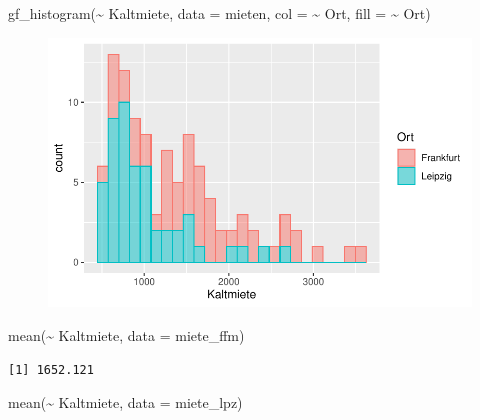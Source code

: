 \documentclass[
  a4paper,
  DIV=11]{scrartcl}
\newenvironment{Shaded}{\begin{snugshade}}{\end{snugshade}}
\newcommand{\AttributeTok}[1]{\textcolor[rgb]{0.40,0.45,0.13}{#1}}
\newcommand{\FunctionTok}[1]{\textcolor[rgb]{0.28,0.35,0.67}{#1}}
\newcommand{\NormalTok}[1]{\textcolor[rgb]{0.00,0.23,0.31}{#1}}
\newcommand{\SpecialCharTok}[1]{\textcolor[rgb]{0.37,0.37,0.37}{#1}}
\begin{document}
\begin{Shaded}
\begin{Highlighting}[]
\FunctionTok{gf\_histogram}\NormalTok{(}\SpecialCharTok{\textasciitilde{}}\NormalTok{ Kaltmiete, }\AttributeTok{data =}\NormalTok{ mieten, }\AttributeTok{col =} \SpecialCharTok{\textasciitilde{}}\NormalTok{ Ort, }\AttributeTok{fill =} \SpecialCharTok{\textasciitilde{}}\NormalTok{ Ort)}
\end{Highlighting}
\end{Shaded}

\begin{figure}[H]

{\centering \includegraphics{Mietmodellierung_files/figure-pdf/unnamed-chunk-11-4.pdf}

}

\end{figure}

\begin{Shaded}
\begin{Highlighting}[]
\FunctionTok{mean}\NormalTok{(}\SpecialCharTok{\textasciitilde{}}\NormalTok{ Kaltmiete, }\AttributeTok{data =}\NormalTok{ miete\_ffm)}
\end{Highlighting}
\end{Shaded}

\begin{verbatim}
[1] 1652.121
\end{verbatim}

\begin{Shaded}
\begin{Highlighting}[]
\FunctionTok{mean}\NormalTok{(}\SpecialCharTok{\textasciitilde{}}\NormalTok{ Kaltmiete, }\AttributeTok{data =}\NormalTok{ miete\_lpz)}
\end{Highlighting}
\end{Shaded}
\end{document}
